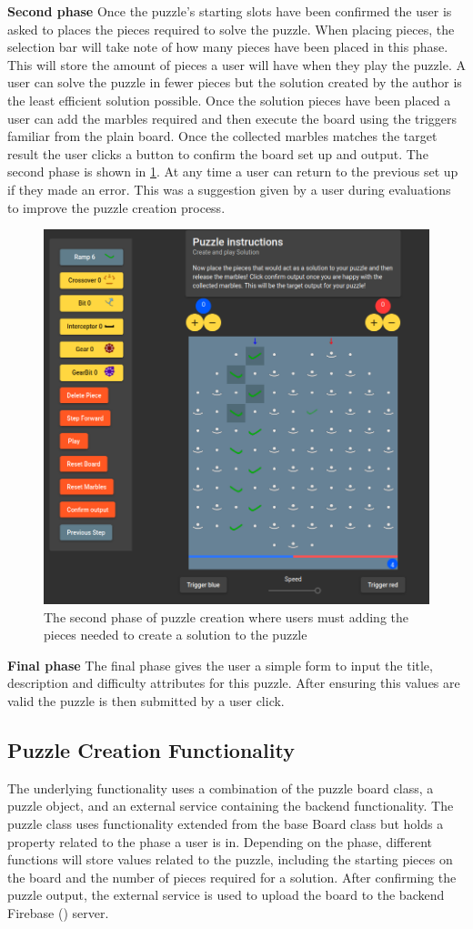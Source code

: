 \documentclass{l4proj}
\begin{document}
\textbf{Second phase}
Once the puzzle's starting slots have been confirmed the user is asked to places the pieces required to solve the puzzle. When placing pieces, the selection bar will take note of how many pieces have been placed in this phase. This will store the amount of pieces a user will have when they play the puzzle. A user can solve the puzzle in fewer pieces but the solution created by the author is the least efficient solution possible. Once the solution pieces have been placed a user can  add the marbles required and then execute the board using the triggers familiar from the plain board. Once the collected marbles matches the target result the user clicks a button to confirm the board set up and output. The second phase is shown in \ref{fig:puzzleCreation}. At any time a user can return to the previous set up if they made an error. This was a suggestion given by a user during evaluations to improve the puzzle creation process.


\begin{figure}
    \centering
    \includegraphics[width=0.65\linewidth]{images/puzzleCreation.png}
    \caption{The second phase of puzzle creation where users must adding the pieces needed to create a solution to the puzzle}
    \label{fig:puzzleCreation}
\end{figure}

\textbf{Final phase}
The final phase gives the user a simple form to input the title, description and difficulty attributes for this puzzle. After ensuring this values are valid the puzzle is then submitted by a user click.

\subsection{Puzzle Creation Functionality}
The underlying functionality uses a combination of the puzzle board class, a puzzle object, and an external service containing the backend functionality. The puzzle class uses functionality extended from the base Board class but holds a property related to the phase a user is in. Depending on the phase, different functions will store values related to the puzzle, including the starting pieces on the board and the number of pieces required for a solution. After confirming the puzzle output, the external service is used to upload the board to the backend Firebase (\cite{firebase}) server.
\end{document}

